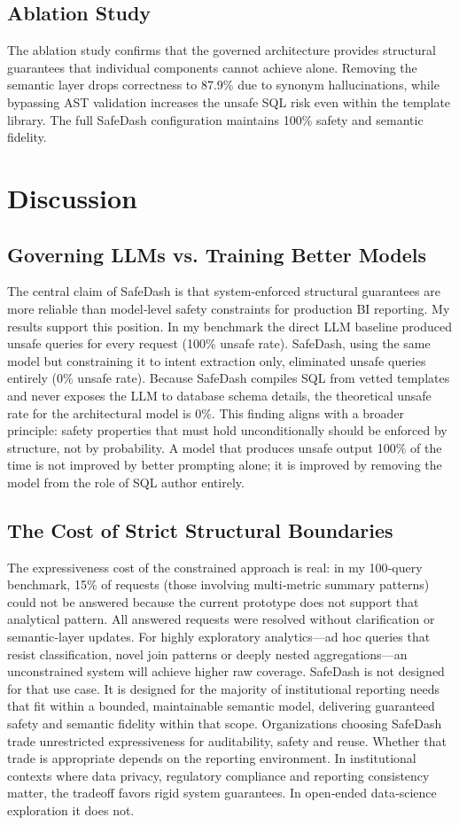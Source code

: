 \documentclass[11pt]{article}
\begin{document}
\subsection{Ablation Study}
The ablation study confirms that the governed architecture provides structural guarantees that individual components cannot achieve alone. Removing the semantic layer drops correctness to 87.9\% due to synonym hallucinations, while bypassing AST validation increases the unsafe SQL risk even within the template library. The full SafeDash configuration maintains 100\% safety and semantic fidelity.

\section{Discussion}
\subsection{Governing LLMs vs. Training Better Models}
The central claim of SafeDash is that system-enforced structural guarantees are more reliable than model‑level safety constraints for production BI reporting. My results support this position. In my benchmark the direct LLM baseline produced unsafe queries for every request (100\% unsafe rate). SafeDash, using the same model but constraining it to intent extraction only, eliminated unsafe queries entirely (0\% unsafe rate). Because SafeDash compiles SQL from vetted templates and never exposes the LLM to database schema details, the theoretical unsafe rate for the architectural model is 0\%. This finding aligns with a broader principle: safety properties that must hold unconditionally should be enforced by structure, not by probability. A model that produces unsafe output 100\% of the time is not improved by better prompting alone; it is improved by removing the model from the role of SQL author entirely.

\subsection{The Cost of Strict Structural Boundaries}
The expressiveness cost of the constrained approach is real: in my 100‑query benchmark, 15\% of requests (those involving multi‑metric summary patterns) could not be answered because the current prototype does not support that analytical pattern. All answered requests were resolved without clarification or semantic‑layer updates. For highly exploratory analytics—ad hoc queries that resist classification, novel join patterns or deeply nested aggregations—an unconstrained system will achieve higher raw coverage. SafeDash is not designed for that use case. It is designed for the majority of institutional reporting needs that fit within a bounded, maintainable semantic model, delivering guaranteed safety and semantic fidelity within that scope. Organizations choosing SafeDash trade unrestricted expressiveness for auditability, safety and reuse. Whether that trade is appropriate depends on the reporting environment. In institutional contexts where data privacy, regulatory compliance and reporting consistency matter, the tradeoff favors rigid system guarantees. In open‑ended data‑science exploration it does not.
\end{document}
